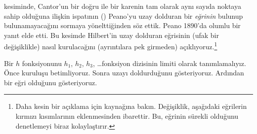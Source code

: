 \documentclass[../../../include/open-logic-section]{subfiles}
\begin{document}


 kesiminde, Cantor'un bir doğru ile bir karenin tam
olarak aynı sayıda noktaya sahip olduğuna ilişkin ispatının
() Peano'yu uzay dolduran bir
\emph{eğrinin} bulunup bulunamayacağını sormaya yönelttiğinden söz ettik.
Peano 1890'da olumlu bir yanıt elde etti. Bu kesimde Hilbert'in uzay dolduran
eğrisinin (ufak bir değişiklikle) nasıl kurulacağını (ayrıntılara pek
girmeden) açıklıyoruz.\footnote{Daha kesin bir açıklama için
\cite{Rose2010} kaynağına bakın. Değişiklik, aşağıdaki eğrilerin kırmızı
kısımlarının eklenmesinden ibarettir. Bu, eğrinin sürekli olduğunu denetlemeyi
biraz kolaylaştırır.}

Bir $h$ fonksiyonunu $h_1$, $h_2$, $h_3$, \dots\@ fonksiyon dizisinin limiti
olarak tanımlamalıyız. Önce kuruluşu betimliyoruz. Sonra uzayı doldurduğunu
gösteriyoruz. Ardından bir eğri olduğunu gösteriyoruz.
\end{document}
